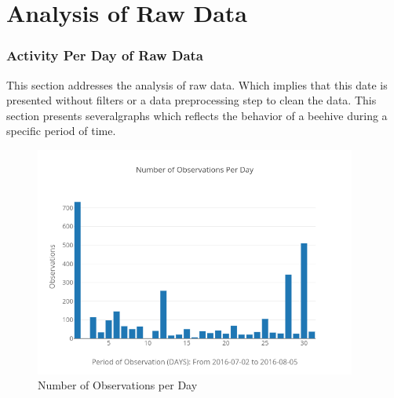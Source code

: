 \documentclass[11pt,fleqn]{book} %
\begin{document}
\chapter{Analysis of Raw Data} 
\normalsize%
\subsection{Activity Per Day of Raw Data}%
\label{subsec:Activity Per Day of Raw Data}%
This section addresses the analysis of raw data. Which implies that this date is presented without filters or a data preprocessing step to clean the data. This section presents severalgraphs which reflects the behavior of a beehive during a specific period of time.%


\begin{figure}[h!]%
\centering%
\includegraphics[width=400px]{Pictures/Morelia Hive 1observationsPerdayUnclean.png}%
\caption{Number of Observations per Day}%
\end{figure}
\end{document}
